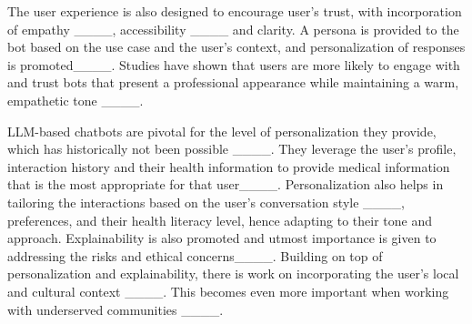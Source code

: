 The user experience is also designed to encourage user’s trust, with incorporation of empathy ____, accessibility ____ and clarity.  A persona is provided to the bot based on the use case and the user’s context, and personalization of responses is promoted____. Studies have shown that users are more likely to engage with and trust bots that present a professional appearance while maintaining a warm, empathetic tone ____. 


LLM-based chatbots are pivotal for the level of personalization they provide, which has historically not been possible ____. They leverage the user's profile, interaction history and their health information to provide medical information that is the most appropriate for that user____. Personalization also helps in tailoring the interactions based on the user's conversation style ____, preferences, and their health literacy level, hence adapting to their tone and approach. Explainability is also promoted and utmost importance is given to addressing the risks and ethical concerns____. Building on top of personalization and explainability, there is work on incorporating the user’s local and cultural context ____. This becomes even more important when working with underserved communities ____. 

